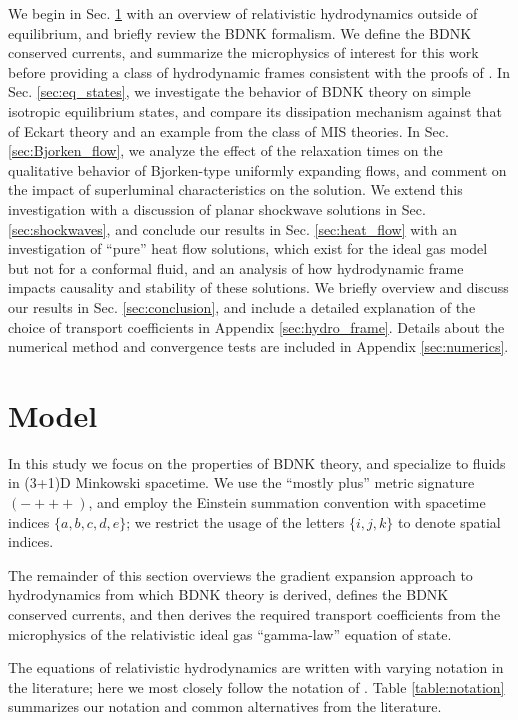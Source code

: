 \documentclass[%
notitlepage,
superscriptaddress,
nofootinbib,
amsmath,
amssymb,
aps,
twocolumn
]{revtex4-1}
\begin{document}
We begin in Sec. \ref{sec:model} with an overview of relativistic
hydrodynamics outside of equilibrium, and briefly review the BDNK
formalism.  We define the BDNK conserved currents, and summarize the
microphysics of interest for this work before providing a class of
hydrodynamic frames consistent with the proofs of \cite{Bemfica:2020zjp}.
In Sec. \ref{sec:eq_states}, we investigate the behavior of BDNK theory on
simple isotropic equilibrium states, and compare its dissipation mechanism
against that of Eckart theory and an example from the class of MIS
theories.  In Sec. \ref{sec:Bjorken_flow}, we analyze the effect of the
relaxation times on the qualitative behavior of Bjorken-type uniformly
expanding flows, and comment on the impact of superluminal
characteristics on the solution.  We extend this investigation with a
discussion of planar shockwave solutions in Sec. \ref{sec:shockwaves}, and
conclude our results in Sec. \ref{sec:heat_flow} with an investigation of
``pure'' heat flow solutions, which exist for the ideal gas model but not
for a conformal fluid, and an analysis of how hydrodynamic frame impacts
causality and stability of these solutions.  We briefly overview and
discuss our results in Sec. \ref{sec:conclusion}, and include a detailed
explanation of the choice of transport coefficients in Appendix
\ref{sec:hydro_frame}.  Details about the numerical method and convergence
tests are included in Appendix \ref{sec:numerics}.

\section{Model} \label{sec:model}

In this study we focus on the properties of BDNK theory, and specialize to
fluids in (3+1)D Minkowski spacetime.  We use the ``mostly plus'' metric
signature $(-+++)$, and employ the Einstein summation convention with
spacetime indices $\{a, b, c, d, e\}$; we restrict the usage of the letters
$\{i, j, k\}$ to denote spatial indices.

The remainder of this section overviews the gradient expansion approach to
hydrodynamics from which BDNK theory is derived, defines the BDNK conserved
currents, and then derives the required transport coefficients from the
microphysics of the relativistic ideal gas ``gamma-law'' equation of state.

The equations of relativistic hydrodynamics are written with varying
notation in the literature; here we most closely follow the notation of
\cite{Bemfica:2020zjp}.  Table \ref{table:notation} summarizes our notation
and common alternatives from the literature.
\end{document}
